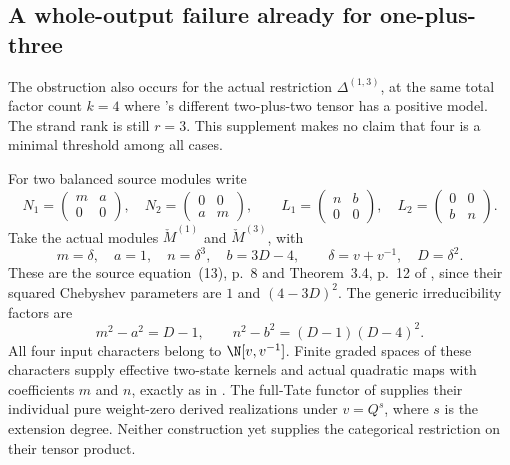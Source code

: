 \subsection{A whole-output failure already for one-plus-three}

The  obstruction also occurs for the
actual restriction \(\Delta^{(1,3)}\), at the
same total factor count \(k=4\) where
's different two-plus-two tensor has
a positive model. The strand rank is still
\(r=3\). This supplement makes no claim that
four is a minimal threshold among all cases.

For two balanced source modules write
\[
 N_1=\begin{pmatrix}m&a\\0&0\end{pmatrix},\quad
 N_2=\begin{pmatrix}0&0\\a&m\end{pmatrix},\qquad
 L_1=\begin{pmatrix}n&b\\0&0\end{pmatrix},\quad
 L_2=\begin{pmatrix}0&0\\b&n\end{pmatrix}.
\]
Take the actual modules
\(\check M^{(1)}\) and \(\check M^{(3)}\), with
\begin{equation}\label{eq:oneThreeActualInputs}
 m=\delta,\quad a=1,\quad
 n=\delta^3,\quad b=3D-4,\qquad
 \delta=v+v^{-1},\quad D=\delta^2.
\end{equation}
These are the source equation~(13), p.~8
and Theorem~3.4, p.~12 of
\cite{BlasiakChebyshev}, since their squared
Chebyshev parameters are \(1\) and \((4-3D)^2\).
The generic irreducibility factors are
\[
        m^2-a^2=D-1,\qquad
        n^2-b^2=(D-1)(D-4)^2.
\]
All four input characters belong to
\(\N[v,v^{-1}]\). Finite graded spaces of
these characters supply effective two-state
kernels and actual quadratic maps with
coefficients \(m\) and \(n\), exactly as
in . The full-Tate functor of
 supplies their individual pure
weight-zero derived realizations under
\(v=Q^s\), where \(s\) is the extension degree.
Neither construction yet supplies the
categorical restriction on their tensor product.

